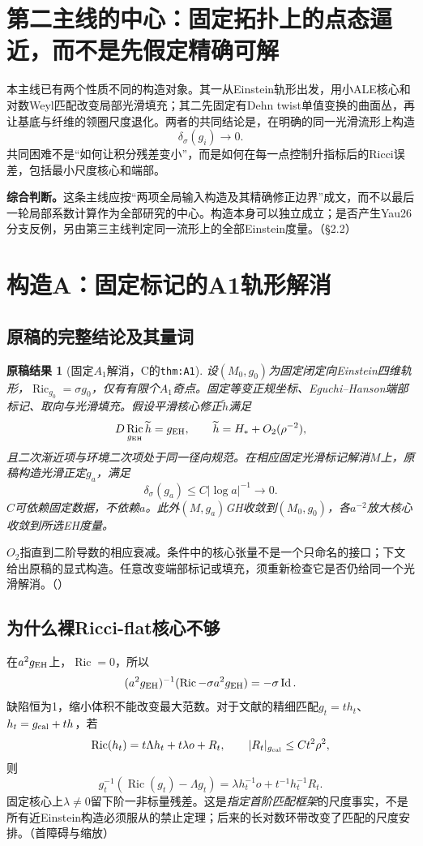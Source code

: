 \documentclass[UTF8,fontset=fandol,zihao=-4]{ctexart}
\theoremstyle{research}
\newtheorem{result}{原稿结果}[section]
\DeclareMathOperator{\Ric}{Ric}
\DeclareMathOperator{\Id}{Id}
\numberwithin{equation}{section}
\begin{document}
\section{第二主线的中心：固定拓扑上的点态逼近，而不是先假定精确可解}
本主线已有两个性质不同的构造对象。其一从Einstein轨形出发，用小ALE核心和对数Weyl匹配改变局部光滑填充；其二先固定有Dehn twist单值变换的曲面丛，再让基底与纤维的领圈尺度退化。两者的共同结论是，在明确的同一光滑流形上构造
\[
\delta_\sigma(g_i)\longrightarrow0.
\]
共同困难不是“如何让积分残差变小”，而是如何在每一点控制升指标后的Ricci误差，包括最小尺度核心和端部。

\textbf{综合判断。}这条主线应按“两项全局输入构造及其精确修正边界”成文，而不以最后一轮局部系数计算作为全部研究的中心。构造本身可以独立成立；是否产生Yau26分支反例，另由第三主线判定同一流形上的全部Einstein度量。\cite{Overview}（§2.2）

\section{构造A：固定标记的A1轨形解消}
\subsection{原稿的完整结论及其量词}
\begin{result}[固定$A_1$解消，C的\texttt{thm:A1}]
设$(M_0,g_0)$为固定闭定向Einstein四维轨形，$\Ric_{g_0}=\sigma g_0$，仅有有限个$A_1$奇点。固定等变正规坐标、Eguchi--Hanson端部标记、取向与光滑填充。假设平滑核心修正$\widetilde h$满足
\[
D\Ric_{g_{\rm EH}}\widetilde h=g_{\rm EH},\qquad
\widetilde h=H_*+O_2(\rho^{-2}),
\]
且二次渐近项与环境二次项处于同一径向规范。在相应固定光滑标记解消$M$上，原稿构造光滑正定$g_a$，满足
\[
\delta_\sigma(g_a)\le C|\log a|^{-1}\to0.
\]
$C$可依赖固定数据，不依赖$a$。此外$(M,g_a)$GH收敛到$(M_0,g_0)$，各$a^{-2}$放大核心收敛到所选EH度量。
\end{result}
$O_2$指直到二阶导数的相应衰减。条件中的核心张量不是一个只命名的接口；下文给出原稿的显式构造。任意改变端部标记或填充，须重新检查它是否仍给同一个光滑解消。\cite{C}（）

\subsection{为什么裸Ricci-flat核心不够}
在$a^2g_{\rm EH}$上，$\Ric=0$，所以
\[
(a^2g_{\rm EH})^{-1}(\Ric-\sigma a^2g_{\rm EH})=-\sigma\Id.
\]
缺陷恒为1，缩小体积不能改变最大范数。对于文献的精细匹配$g_t=th_t$、$h_t=g_{\rm cal}+th$，若
\[
\Ric(h_t)=t\Lambda h_t+t\lambda o+R_t,
\qquad |R_t|_{g_{\rm cal}}\le Ct^2\rho^2,
\]
则
\[
g_t^{-1}(\Ric(g_t)-\Lambda g_t)
=\lambda h_t^{-1}o+t^{-1}h_t^{-1}R_t.
\]
固定核心上$\lambda\ne0$留下阶一非标量残差。这是\emph{指定首阶匹配框架}的尺度事实，不是所有近Einstein构造必须服从的禁止定理；后来的长对数环带改变了匹配的尺度安排。\cite{C}（首障碍与缩放）\cite{Biquard,MV}
\end{document}
